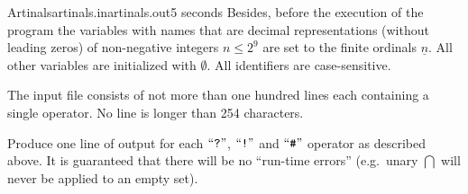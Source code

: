 \begin{problem}{Artinals}{artinals.in}{artinals.out}{5 seconds}
Besides, before the execution of the program the variables with names that 
are decimal representations (without leading zeros) of non-negative integers 
$n\leq2^9$ are set to the finite ordinals $\underline n$. All other 
variables are initialized with $\emptyset$. All identifiers are case-sensitive. 

\InputFile

The input file consists of not more than one hundred lines each containing 
a single operator. No line is longer than 254 characters.

\OutputFile

Produce one line of output for each $\text{``{\tt ?}''}$, $\text{``{\tt !}''}$ and $\text{``{\tt \#}''}$ operator 
as described above. It is guaranteed that there will be no 
``run-time errors'' (e.g.\ unary $\bigcap$ will never be applied to an empty set).

\Example

\begin{example}[*\widthout{9.3cm}\noindent]
%
\end{example}

\end{problem}
